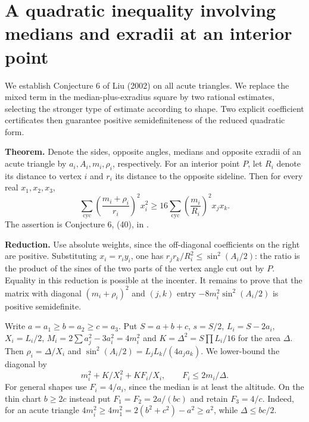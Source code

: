 \documentclass[11pt,a4paper]{article}
\numberwithin{equation}{section}
\theoremstyle{definition}
\theoremstyle{remark}
\newenvironment{sectionabstract}{\par\smallskip\begingroup\small\noindent}{\par\endgroup\medskip}
\begin{document}
\par\endgroup

\begingroup
\newcommand{\cy}{\sum_{\mathrm{cyc}}}
\section{\texorpdfstring{A quadratic inequality involving medians and exradii at an interior point}{A quadratic inequality involving medians and exradii at an interior point}}\label{section:r46keio}
\par\medskip


\begin{sectionabstract}
We establish Conjecture 6 of Liu (2002) on all acute triangles. We replace the mixed term in the median-plus-exradius square by two rational estimates, selecting the stronger type of estimate according to shape. Two explicit coefficient certificates then guarantee positive semidefiniteness of the reduced quadratic form.
\end{sectionabstract}
\textbf{Theorem.} Denote the sides, opposite angles, medians and opposite exradii of an acute triangle by $a_i,A_i,m_i,\rho_i$, respectively. For an interior point $P$, let $R_i$ denote its distance to vertex $i$ and $r_i$ its distance to the opposite sideline. Then for every real $x_1,x_2,x_3$,
\[
 \cy\left(\frac{m_i+\rho_i}{r_i}\right)^2 x_i^2
 \ge16\cy\left(\frac{m_i}{R_i}\right)^2 x_jx_k.
\]
The assertion is Conjecture 6, (40), in \cite{r46keio:liu}.

\textbf{Reduction.} Use absolute weights, since the off-diagonal coefficients on the right are positive. Substituting $x_i=r_i y_i$, one has $r_jr_k/R_i^2\le \sin^2(A_i/2)$: the ratio is the product of the sines of the two parts of the vertex angle cut out by $P$. Equality in this reduction is possible at the incenter. It remains to prove that the matrix with diagonal $(m_i+\rho_i)^2$ and $(j,k)$ entry $-8m_i^2\sin^2(A_i/2)$ is positive semidefinite.

Write $a=a_1\ge b=a_2\ge c=a_3$. Put $S=a+b+c$, $s=S/2$, $L_i=S-2a_i$, $X_i=L_i/2$, $M_i=2\sum a_j^2-3a_i^2=4m_i^2$ and $K=\Delta^2=S\prod L_i/16$ for the area $\Delta$. Then $\rho_i=\Delta/X_i$ and $\sin^2(A_i/2)=L_jL_k/(4a_ja_k)$.
We lower-bound the diagonal by
\[
 m_i^2+K/X_i^2+KF_i/X_i,\qquad
 F_i\le 2m_i/\Delta.
\]
For general shapes use $F_i=4/a_i$, since the median is at least the altitude. On the thin chart $b\ge2c$ instead put $F_1=F_2=2a/(bc)$ and retain $F_3=4/c$. Indeed, for an acute triangle
$4m_i^2\ge4m_1^2=2(b^2+c^2)-a^2\ge a^2$, while $\Delta\le bc/2$.
\end{document}
